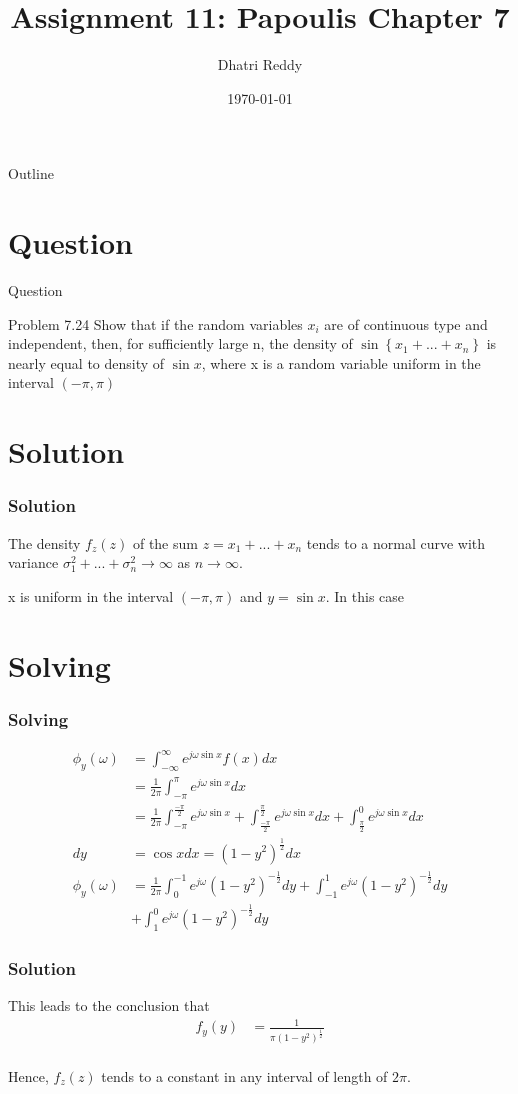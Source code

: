 \documentclass{beamer}
\title{Assignment 11: Papoulis Chapter 7 }
\author{Dhatri Reddy}
\date{\today}
\providecommand{\cbrak}[1]{\ensuremath{\left\{#1\right\}}}
\providecommand{\brak}[1]{\ensuremath{\left(#1\right)}}
\begin{document}
\begin{frame}
    \titlepage 
\end{frame}

\logo{}

\begin{frame}{Outline}
    \tableofcontents
\end{frame}

\section{Question}
\begin{frame}{Question}
    \begin{block}{Problem 7.24}
        Show that if the random variables $x_{i}$ are of continuous type and independent, then, for sufficiently large n, the density of $\sin{\cbrak{x_{1} + ... + x_{n}}}$ is nearly equal to density of $\sin{x}$, where x is a random variable uniform in the interval \brak{-\pi, \pi}
\end{block}
\end{frame}

\section{Solution}
\begin{frame}
\frametitle{Solution}

The density $f_{z}\brak{z}$ of the sum $z = x_{1} + ... + x_{n}$ tends to a normal curve with variance $\sigma_{1}^{2} + ... + \sigma_{n}^{2}\to \infty$ as $n \to \infty$.

x is uniform in the interval \brak{-\pi, \pi} and $y = \sin{x}$. 
In this case 

\end{frame}

\section{Solving}
\begin{frame}
\frametitle{Solving}
\begin{align}
    \phi_{y}\brak{\omega} &= \int_{-\infty}^\infty e^{j\omega\sin{x}}f\brak{x}dx\\
    &= \frac{1}{2\pi}\int_{-\pi}^\pi e^{j\omega\sin{x}}dx\\
    &= \frac{1}{2\pi}\int_{-\pi}^\frac{-\pi}{2} e^{j\omega\sin{x}} + \int_{\frac{-\pi}{2}}^\frac{\pi}{2} e^{j\omega\sin{x}} dx + \int_{\frac{\pi}{2}}^{0} e^{j\omega\sin{x}} dx\\
    dy &= \cos{x} dx = \brak{1-y^{2}}^{\frac{1}{2}} dx\\
    \phi_{y}\brak{\omega} &= \frac{1}{2\pi}\int_{0}^{-1}e^{j\omega}\brak{1-y^{2}}^{-\frac{1}{2}} dy  + \int_{-1}^{1}e^{j\omega}\brak{1-y^{2}}^{-\frac{1}{2}} dy\\
    & +\int_{1}^{0}e^{j\omega}\brak{1-y^{2}}^{-\frac{1}{2}} dy
\end{align}
\end{frame}

\begin{frame}
\frametitle{Solution}
This leads to the conclusion that 
\begin{align}
    f_{y}\brak{y} &= \frac{1}{\pi \brak{1-y^2}^\frac{1}{2}}\\
\end{align}

Hence, $f_{z}\brak{z}$ tends to a constant in any interval of length of $2\pi$.
\end{frame}
\end{document}

